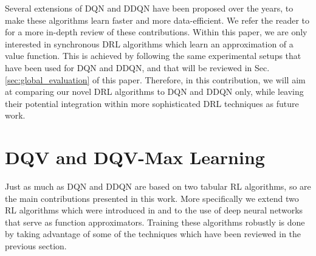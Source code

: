 Several extensions of DQN and DDQN have been proposed over the years, to make these algorithms learn faster and more data-efficient. We refer the reader to \cite{li2017deep} for a more in-depth review of these contributions. Within this paper, we are only interested in synchronous DRL algorithms which learn an approximation of a value function. This is achieved by following the same experimental setups that have been used for DQN and DDQN, and that will be reviewed in Sec. \ref{sec:global_evaluation} of this paper. Therefore, in this contribution, we will aim at comparing our novel DRL algorithms to DQN and DDQN only, while leaving their potential integration within more sophisticated DRL techniques as future work.

\section{DQV and DQV-Max Learning}
\label{sec:dqv_family}

Just as much as DQN and DDQN are based on two tabular RL algorithms, so are the main contributions presented in this work. More specifically we extend two RL algorithms which were introduced in \cite{wiering2005qv} and \cite{wiering2009qv} to the use of deep neural networks that serve as function approximators. Training these algorithms robustly is done by taking advantage of some of the techniques which have been reviewed in the previous section.

